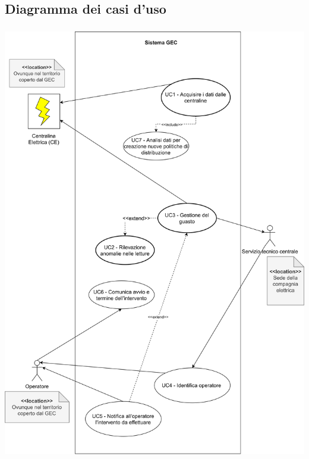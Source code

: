 \documentclass{beamer}
\begin{document}
	\subsection{Diagramma dei casi d'uso}\label{use_cases_diagram}
	\begin{frame}
		\frametitle{}
		\begin{center}
			\includegraphics[width=\textwidth, height=0.85\textheight, keepaspectratio=true]{use_cases_diagram.png}
		\end{center}
	\end{frame}
\end{document}
